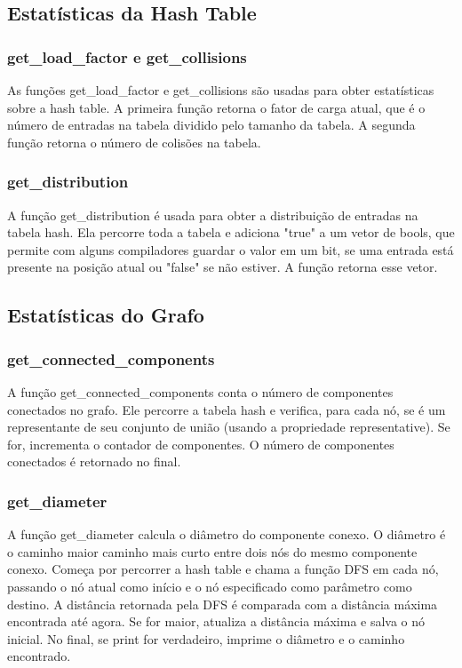 \documentclass[a4paper,11pt]{article}
\begin{document}
    \subsection{Estatísticas da Hash Table}\label{subsec:estatisticas-da-hash-table}

    \subsubsection{get\_load\_factor e get\_collisions}
   As funções get\_load\_factor e get\_collisions são usadas para obter estatísticas sobre a hash table. A primeira função retorna o fator de carga atual, que é o número de entradas na tabela dividido pelo tamanho da tabela. A segunda função retorna o número de colisões na tabela.
    
    \subsubsection{get\_distribution}
    A função get\_distribution é usada para obter a distribuição de entradas na tabela hash. Ela percorre toda a tabela e adiciona "true" a um vetor de bools, que permite com alguns compiladores guardar o valor em um bit, se uma entrada está presente na posição atual ou "false" se não estiver. A função retorna esse vetor.
    
    \subsection{Estatísticas do Grafo}\label{subsec:estatisticas-do-grafo}
    
    \subsubsection{get\_connected\_components}
    A função get\_connected\_components conta o número de componentes conectados no grafo. Ele percorre a tabela hash e verifica, para cada nó, se é um representante de seu conjunto de união (usando a propriedade representative). Se for, incrementa o contador de componentes. O número de componentes conectados é retornado no final.
    
    \subsubsection{get\_diameter}
    A função get\_diameter calcula o diâmetro do componente conexo. O diâmetro é o caminho maior caminho mais curto entre dois nós do mesmo componente conexo. Começa por percorrer a hash table e chama a função DFS em cada nó, passando o nó atual como início e o nó especificado como parâmetro como destino. A distância retornada pela DFS é comparada com a distância máxima encontrada até agora. Se for maior, atualiza a distância máxima e salva o nó inicial. No final, se print for verdadeiro, imprime o diâmetro e o caminho encontrado.
    
\end{document}
